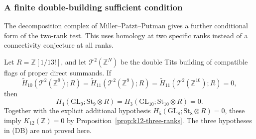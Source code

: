 \subsubsection{A finite double-building sufficient condition}

The decomposition complex of Miller--Patzt--Putman gives a further
conditional form of the two-rank test. This uses homology at two
specific ranks instead of a connectivity conjecture at all ranks.

\begin{proposition}[K17-K12-DOUBLE]\label{prop:k12-double-building}
Let $R=\mathbb Z[1/13!]$, and let $\mathcal T^2(\mathbb Z^N)$
be the double Tits building of compatible flags of proper direct
summands. If
\[
 \widetilde H_{10}(\mathcal T^2(\mathbb Z^9);R)=
 \widetilde H_{11}(\mathcal T^2(\mathbb Z^9);R)=
 \widetilde H_{11}(\mathcal T^2(\mathbb Z^{10});R)=0,
                                                               \tag{DB}
\]
then
\[
 H_4(\mathrm{GL}_9;\mathrm{St}_9\otimes R)=
 H_3(\mathrm{GL}_{10};\mathrm{St}_{10}\otimes R)=0.
\]
Together with the explicit additional hypothesis
$H_5(\mathrm{GL}_8;\mathrm{St}_8\otimes R)=0$, these imply
$K_{12}(\mathbb Z)=0$ by Proposition~\ref{prop:k12-three-ranks}.
The three hypotheses in \textup{(DB)} are not proved here.
\end{proposition}

